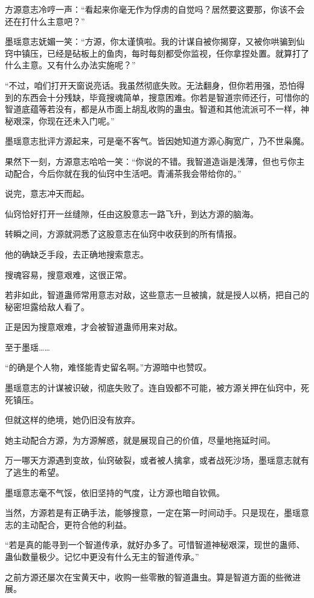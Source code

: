 \begin{this_body}
方源意志冷哼一声：“看起来你毫无作为俘虏的自觉吗？居然要这要那，你该不会还在打什么主意吧？”

墨瑶意志妩媚一笑：“方源，你太谨慎啦。我的计谋自被你揭穿，又被你哄骗到仙窍中镇压，已经是砧板上的鱼肉，每时每刻都受你监视，任你拿捏处置。就算打了什么主意。又有什么办法实施呢？”

“不过，咱们打开天窗说亮话。我虽然彻底失败。无法翻身，但你若用强，恐怕得到的东西会十分残缺，毕竟搜魂简单，搜意困难。你若是智道宗师还行，可惜你的智道底蕴等若没有，都是从市面上胡乱收购的蛊虫。智道和其他流派可不一样，神秘艰深，你现在还未入门呢。”

墨瑶意志批评方源起来，可是毫不客气。皆因她知道方源心胸宽广，乃不世枭魔。

果然下一刻，方源意志哈哈一笑：“你说的不错。我智道造诣是浅薄，但也亏你主动配合，今后你就在我的仙窍中生活吧。青浦茶我会带给你的。”

说完，意志冲天而起。

仙窍恰好打开一丝缝隙，任由这股意志一路飞升，到达方源的脑海。

转瞬之间，方源就洞悉了这股意志在仙窍中收获到的所有情报。

他的确缺乏手段，去正确地搜索意志。

搜魂容易，搜意艰难，这很正常。

若非如此，智道蛊师常用意志对敌，这些意志一旦被擒，就是授人以柄，把自己的秘密坦露给敌人看了。

正是因为搜意艰难，才会被智道蛊师用来对敌。

至于墨瑶……

“的确是个人物，难怪能青史留名啊。”方源暗中也赞叹。

墨瑶意志的计谋被识破，彻底失败了。连自毁都不可能，被方源关押在仙窍中，死死镇压。

但就这样的绝境，她仍旧没有放弃。

她主动配合方源，为方源解惑，就是展现自己的价值，尽量地拖延时间。

万一哪天方源遇到变故，仙窍破裂，或者被人擒拿，或者战死沙场，墨瑶意志就有了逃生的希望。

墨瑶意志毫不气馁，依旧坚持的气度，让方源也暗自钦佩。

当然，方源若是有正确手法，能够搜意，一定在第一时间动手。只是现在，墨瑶意志的主动配合，更符合他的利益。

“若是真的能寻到一个智道传承，就好办多了。可惜智道神秘艰深，现世的蛊师、蛊仙数量极少。记忆中更没有什么无主的智道传承。”

之前方源还屡次在宝黄天中，收购一些零散的智道蛊虫。算是智道方面的些微进展。


\end{this_body}
